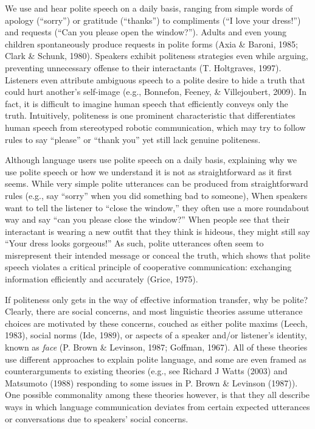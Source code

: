 \documentclass[oneside]{report}
\begin{document}
We use and hear polite speech on a daily basis, ranging from simple
words of apology (``sorry'') or gratitude (``thanks'') to compliments
(``I love your dress!'') and requests (``Can you please open the
window?''). Adults and even young children spontaneously produce
requests in polite forms (Axia \& Baroni, 1985; Clark \& Schunk, 1980).
Speakers exhibit politeness strategies even while arguing, preventing
unnecessary offense to their interactants (T. Holtgraves, 1997).
Listeners even attribute ambiguous speech to a polite desire to hide a
truth that could hurt another's self-image (e.g., Bonnefon, Feeney, \&
Villejoubert, 2009). In fact, it is difficult to imagine human speech
that efficiently conveys only the truth. Intuitively, politeness is one
prominent characteristic that differentiates human speech from
stereotyped robotic communication, which may try to follow rules to say
``please'' or ``thank you'' yet still lack genuine politeness.

Although language users use polite speech on a daily basis, explaining
why we use polite speech or how we understand it is not as
straightforward as it first seems. While very simple polite utterances
can be produced from straightforward rules (e.g., say ``sorry'' when you
did something bad to someone), When speakers want to tell the listener
to ``close the window,'' they often use a more roundabout way and say
``can you please close the window?'' When people see that their
interactant is wearing a new outfit that they think is hideous, they
might still say ``Your dress looks gorgeous!'' As such, polite
utterances often seem to misrepresent their intended message or conceal
the truth, which shows that polite speech violates a critical principle
of cooperative communication: exchanging information efficiently and
accurately (Grice, 1975).

If politeness only gets in the way of effective information transfer,
why be polite? Clearly, there are social concerns, and most linguistic
theories assume utterance choices are motivated by these concerns,
couched as either polite maxims (Leech, 1983), social norms (Ide, 1989),
or aspects of a speaker and/or listener's identity, known as \emph{face}
(P. Brown \& Levinson, 1987; Goffman, 1967). All of these theories use
different approaches to explain polite language, and some are even
framed as counterarguments to existing theories (e.g., see Richard J
Watts (2003) and Matsumoto (1988) responding to some issues in P. Brown
\& Levinson (1987)). One possible commonality among these theories
however, is that they all describe ways in which language communication
deviates from certain expected utterances or conversations due to
speakers' social concerns.
\end{document}
